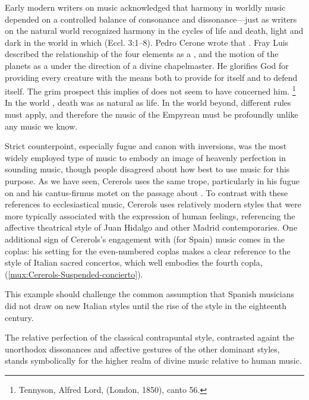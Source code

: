 Early modern writers on music acknowledged that harmony in worldly music
depended on a controlled balance of consonance and dissonance---just as writers
on the natural world recognized harmony in the cycles of life and death, light
and dark in the world in which  (Eccl. 3:1--8).
Pedro Cerone wrote that .%
    \Autocite[616]{Cerone:Melopeo}
Fray Luis described the relationship of the four elements as a , and the motion of the planets as a  under the
direction of a divine chapelmaster.%
    \Autocite[191]{LuisdeGranada:Simbolo}
He glorifies God for providing every creature with the means both to provide
for itself and to defend itself. 
The grim prospect this implies of  does
not seem to have concerned him.%
    \footnote{Tennyson, Alfred Lord,  (London,
    1850), canto 56.}
In the world , death was as natural as life.
In the world beyond, different rules must apply, and therefore the music of the
Empyrean must be profoundly unlike any music we know.

Strict counterpoint, especially fugue and canon with inversions, was the most
widely employed type of music to embody an image of heavenly perfection in
sounding music, though people disagreed about how best to use music for this
purpose.%
    \Autocite{Yearsley:Buxtehude}
As we have seen, Cererols uses the same trope, particularly in his fugue on
 and his cantus-firmus motet on the passage about
.
To contrast with these references to ecclesiastical music, Cererols uses
relatively modern styles that were more typically associated with the expression
of human feelings, referencing the affective theatrical style of Juan Hidalgo
and other Madrid contemporaries.
One additional sign of Cererols's engagement with (for Spain) 
music comes in the coplas: his setting for the even-numbered coplas makes a
clear reference to the style of Italian sacred concertos, which well embodies
the fourth copla, 
(\cref{mux:Cererols-Suspended-concierto}).%
\begin{Footnote}
    This example should challenge the common assumption that Spanish musicians
    did not draw on new Italian styles until the rise of the  style
    in the eighteenth century.
\end{Footnote}
The relative perfection of the classical contrapuntal style, contrasted againt
the unorthodox dissonances and affective gestures of the other dominant styles,
stands symbolically for the higher realm of divine music relative to human
music.

